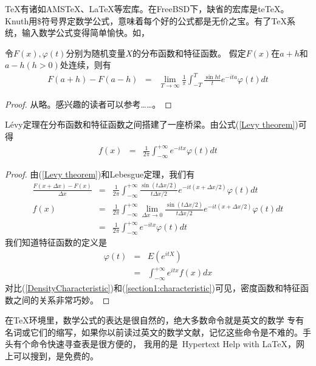 \indent   %
\TeX{}有诸如AMS\TeX、\LaTeX{}等宏库。在FreeBSD下，缺省的宏库是te\TeX。Knuth用\$符号界定数学公式，意味着每个好的公式都是无价之宝。有了\TeX{}系统，输入数学公式变得简单愉快。如，
\begin{theorem}
令$F(x),\varphi(t)$分别为随机变量$X$的分布函数和特征函数。
假定$F(x)$在$a+h$和$a-h (h>0)$处连续，则有
\begin{eqnarray}
  \label{Levy theorem}  %
F(a+h)-F(a-h)&=&\lim_{T\rightarrow\infty} \frac{1}{\pi}\int^{T}_{-T} \frac{\sin ht}{t} e^{-ita} \varphi(t)dt
\end{eqnarray}
\end{theorem}
\begin{proof}
  从略。感兴趣的读者可以参考……。
\end{proof}
L\'{e}vy定理在分布函数和特征函数之间搭建了一座桥梁。由公式(\ref{Levy theorem})可得
\begin{eqnarray}
  \label{DensityCharacteristic}   %
  f(x)&=&\frac{1}{2\pi}\int^{+\infty}_{-\infty} e^{-itx}\varphi(t)dt
\end{eqnarray}
\begin{proof}
由(\ref{Levy theorem})和Lebesgue定理，我们有
\begin{eqnarray}
  \frac{F(x+\Delta x)-F(x)}{\Delta x}&=&\frac{1}{2\pi} \int^{+\infty}_{-\infty}
\frac{\sin(t\Delta x/2)}{t\Delta x/2} e^{-it(x+\Delta x/2)} \varphi(t) dt\nonumber\\
  f(x)&=&\frac{1}{2\pi} \int^{+\infty}_{-\infty} \lim_{\Delta x\rightarrow 0}
\frac{\sin(t\Delta x/2)}{t\Delta x/2} e^{-it(x+\Delta x/2)} \varphi(t) dt\nonumber\\
  &=&\frac{1}{2\pi}\int^{+\infty}_{-\infty} e^{-itx}\varphi(t)dt\nonumber
\end{eqnarray}
我们知道特征函数的定义是
\begin{eqnarray}
  \label{section1:characteristic}   %
  \varphi(t)&=& E(e^{itX})\nonumber\\
            &=& \int^{+\infty}_{-\infty} e^{itx} f(x)dx
\end{eqnarray}
对比(\ref{DensityCharacteristic})和(\ref{section1:characteristic})可见，密度函数和特征函数之间的关系非常巧妙。
\end{proof}
\HandRight 在\TeX{}环境里，数学公式的表达是很自然的，绝大多数命令就是英文的数学
专有名词或它们的缩写，如果你以前读过英文的数学文献，记忆这些命令是不难的。手头有个命令快速寻查表是很方便的，
我用的是~Hypertext Help with \LaTeX，网上可以搜到，是免费的。



